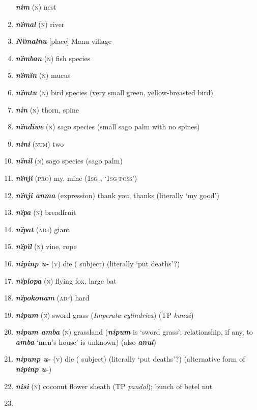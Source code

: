 \begin{enumerate}[noitemsep, label={}, align=left, widest=190, labelsep=1ex,leftmargin=*,itemindent=-10pt]
\textbf{\textit{nim}} (\textsc{n}) nest \item 
\textbf{\textit{nïmal}} (\textsc{n}) river \item 
\textbf{\textit{Nïmalnu}} [place] Manu village \item 
\textbf{\textit{nïmban}} (\textsc{n}) fish species \item 
\textbf{\textit{nïmïn}} (\textsc{n}) mucus \item 
\textbf{\textit{nïmtu}} (\textsc{n}) bird species (very small green, yellow-breasted bird) \item 
\textbf{\textit{nin}} (\textsc{n}) thorn, spine \item 
\textbf{\textit{nïndiwe}} (\textsc{n}) sago species (small sago palm with no spines) \item 
\textbf{\textit{nini}} (\textsc{num}) two \item 
\textbf{\textit{nïnil}} (\textsc{n}) sago species (sago palm) \item 
\textbf{\textit{nïnji}} (\textsc{pro}) my, mine (1\textsc{sg} , ‘\textsc{1sg-poss}’) \item 
\textbf{\textit{nïnji anma}} (expression) thank you, thanks (literally ‘my good’) \item 
\textbf{\textit{nïpa}} (\textsc{n}) breadfruit \item 
\textbf{\textit{nïpat}} (\textsc{adj}) giant \item 
\textbf{\textit{nïpïl}} (\textsc{n}) vine, rope \item 
\textbf{\textit{nipinp u-}} (\textsc{v}) die ( subject) (literally ‘put deaths’?) \item 
\textbf{\textit{nïplopa}} (\textsc{n}) flying fox, large bat \item 
\textbf{\textit{nïpokonam}} (\textsc{adj}) hard \item 
\textbf{\textit{nipum}} (\textsc{n}) sword grass (\textit{Imperata cylindrica}) (TP \textit{kunai}) \item 
\textbf{\textit{nipum amba}} (\textsc{n}) grassland (\textbf{\textit{nipum}} is ‘sword grass’; relationship, if any, to \textbf{\textit{amba}} ‘men’s house’ is unknown) (also \textbf{\textit{anul}}) \item 
\textbf{\textit{nipunp u-}} (\textsc{v}) die ( subject) (literally ‘put deaths’?) (alternative form of \textbf{\textit{nipinp u-}}) \item 
\textbf{\textit{nisi}} (\textsc{n}) coconut flower sheath (TP \textit{pandol}); bunch of betel nut \item 

\end{enumerate}
